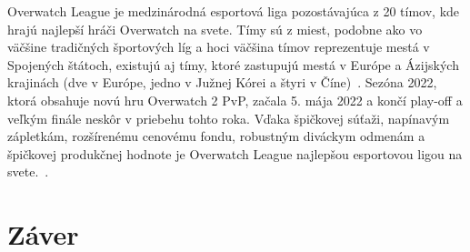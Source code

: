 \documentclass[10pt,oneside,slovak,a4paper]{article}
\begin{document}
Overwatch League je medzinárodná esportová liga pozostávajúca z 20 tímov, kde hrajú najlepší hráči Overwatch na svete. Tímy sú z miest, podobne ako vo väčšine tradičných športových líg a hoci väčšina tímov reprezentuje mestá v Spojených štátoch, existujú aj tímy, ktoré zastupujú mestá v Európe a Ázijských krajinách (dve v Európe, jedno v Južnej Kórei a štyri v Číne)~\cite{Overwatchesport}. Sezóna 2022, ktorá obsahuje novú hru Overwatch 2 PvP, začala 5. mája 2022 a končí play-off a veľkým finále neskôr v priebehu tohto roka. Vďaka špičkovej súťaži, napínavým zápletkám, rozšírenému cenovému fondu, robustným diváckym odmenám a špičkovej produkčnej hodnote je Overwatch League najlepšou esportovou ligou na svete.~\cite{Overwatchsite}.



\section{Záver} \label{zaver} %






\end{document}
